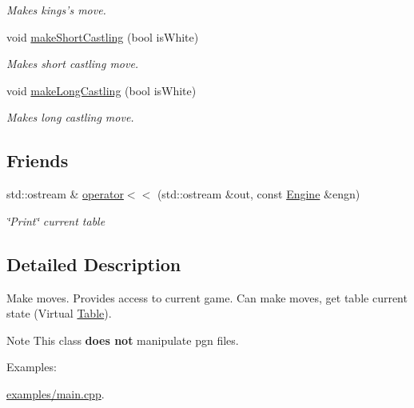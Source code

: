 \begin{DoxyCompactItemize}
\begin{DoxyCompactList}\small\item\em Makes kings's move. \item\end{DoxyCompactList}\item 
void \hyperlink{classChEngn_1_1Engine_a4d6deb7c26002fd2a39367a0fcc9b75e}{makeShortCastling} (bool isWhite)
\begin{DoxyCompactList}\small\item\em Makes short castling move. \item\end{DoxyCompactList}\item 
void \hyperlink{classChEngn_1_1Engine_ac054d7b903d1b353dcfc80a6cbd32aba}{makeLongCastling} (bool isWhite)
\begin{DoxyCompactList}\small\item\em Makes long castling move. \item\end{DoxyCompactList}\end{DoxyCompactItemize}
\subsection*{Friends}
\begin{DoxyCompactItemize}
\item 
\hypertarget{classChEngn_1_1Engine_a886da6512b271d26a1fee49a317d2308}{
std::ostream \& \hyperlink{classChEngn_1_1Engine_a886da6512b271d26a1fee49a317d2308}{operator$<$$<$} (std::ostream \&out, const \hyperlink{classChEngn_1_1Engine}{Engine} \&engn)}
\label{classChEngn_1_1Engine_a886da6512b271d26a1fee49a317d2308}

\begin{DoxyCompactList}\small\item\em \char`\"{}Print\char`\"{} current table \item\end{DoxyCompactList}\end{DoxyCompactItemize}


\subsection{Detailed Description}
Make moves. Provides access to current game. Can make moves, get table current state (Virtual \hyperlink{classChEngn_1_1Table}{Table}).

\begin{DoxyNote}{Note}
This class {\bfseries does not} manipulate pgn files. 
\end{DoxyNote}
\begin{Desc}
\item[Examples: ]\par


\hyperlink{examples_2main_8cpp-example}{examples/main.cpp}.

\end{Desc}


